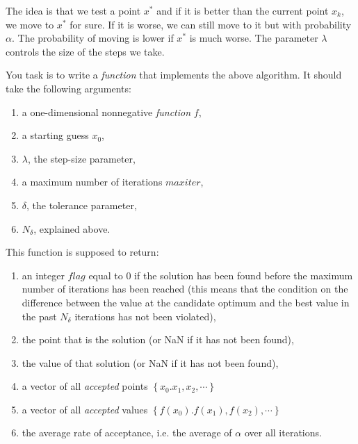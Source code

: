 \documentclass[english,hyperref={pdftex,pdfpagemode=UseNone,hidelinks}]{tufte-handout}
\begin{document}
The idea is that we test a point $x^*$ and if it is better than the current point $x_k$, we move to $x^*$ for sure. If it is worse, we can still move to it but with probability $\alpha$. The probability of moving is lower if $x^*$ is much worse. The parameter $\lambda$ controls the size of the steps we take. 

You task is to write a \emph{function} that implements the above algorithm. It should take the following arguments:
\begin{enumerate}
\item a one-dimensional nonnegative \emph{function} $f$, 
\item a starting guess $x_{0}$,
\item $\lambda$, the step-size parameter, 
\item a maximum number of iterations $maxiter$, 
\item $\delta$, the tolerance parameter,
\item $N_\delta$, explained above.
\end{enumerate}
This function is supposed to return: 
\begin{enumerate}
\item an integer $flag$ equal to 0 if the solution has been found before
the maximum number of iterations has been reached (this means that the condition on the difference between the value at the candidate optimum and the best value in the past $N_\delta$ iterations has not been violated), 
\item the point that is the solution (or NaN if it has not been found),
\item the value of that solution (or NaN if it has not been found),  
\item a vector of all \emph{accepted} points $\left\{ x_{0}.x_{1},x_{2},\cdots\right\} $
\item a vector of all \emph{accepted} values $\left\{ f(x_{0}).f(x_{1}),f(x_{2}),\cdots\right\} $
\item the average rate of acceptance, i.e. the average of $\alpha$ over all iterations.
\end{enumerate}
\end{document}
